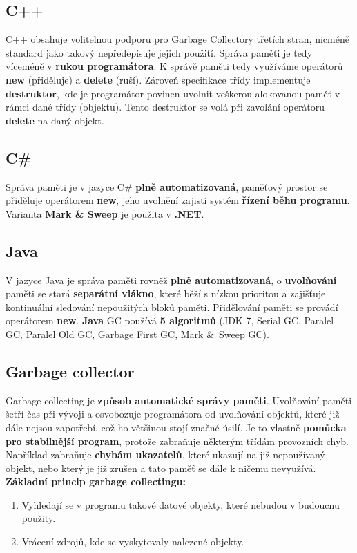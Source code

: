 \subsection{C++}
C++ obsahuje volitelnou podporu pro Garbage Collectory třetích stran, nicméně standard jako takový nepředepisuje jejich použití. Správa paměti je tedy víceméně v \textbf{rukou programátora}. K správě paměti tedy využíváme operátorů \textbf{new} (přiděluje) a \textbf{delete} (ruší). Zároveň specifikace třídy implementuje \textbf{destruktor}, kde je programátor povinen uvolnit veškerou alokovanou paměť v rámci dané třídy (objektu). Tento destruktor se volá při zavolání operátoru \textbf{delete} na daný objekt.

\subsection{C\#}
Správa paměti je v jazyce C\# \textbf{plně automatizovaná}, paměťový prostor se přiděluje operátorem \textbf{new}, jeho uvolnění zajistí systém \textbf{řízení běhu programu}. Varianta \textbf{Mark \& Sweep} je použita v \textbf{.NET}.

\subsection{Java}
V jazyce Java je správa paměti rovněž \textbf{plně automatizovaná}, o \textbf{uvolňování} paměti se stará \textbf{separátní vlákno}, které běží s nízkou prioritou a zajišťuje kontinuální sledování nepoužitých bloků paměti. Přidělování paměti se provádí operátorem \textbf{new}. \textbf{Java} GC používá \textbf{5 algoritmů} (JDK 7, Serial GC, Paralel GC, Paralel Old GC, Garbage First GC, Mark \& Sweep GC).

\subsection{Garbage collector}
Garbage collecting je \textbf{způsob automatické správy paměti}. Uvolňování paměti  šetří čas při vývoji a osvobozuje programátora od uvolňování objektů, které již dále nejsou zapotřebí, což ho většinou stojí značné úsilí. Je to vlastně \textbf{pomůcka pro stabilnější program}, protože zabraňuje některým třídám provozních chyb. Například zabraňuje \textbf{chybám ukazatelů}, které ukazují na již nepoužívaný objekt, nebo který je již zrušen a tato paměť se dále k ničemu nevyužívá. \textbf{Základní princip garbage collectingu:}
\begin{enumerate}
\item Vyhledají se v programu takové datové objekty, které nebudou v budoucnu použity.
\item Vrácení zdrojů, kde se vyskytovaly nalezené objekty.
\end{enumerate}

